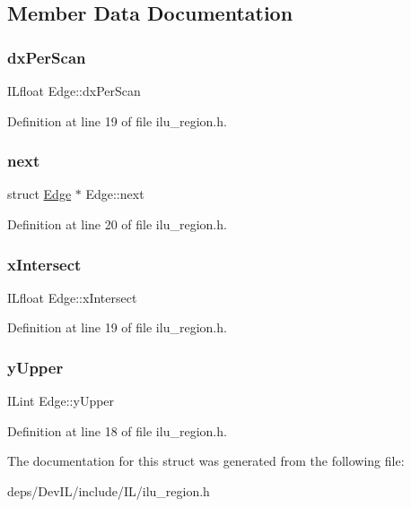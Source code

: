 \subsection{Member Data Documentation}
\mbox{\label{structEdge_ac68297f57351e80c50311788dfc7ebb7}} 
\subsubsection{\texorpdfstring{dx\+Per\+Scan}{dxPerScan}}
{\footnotesize\ttfamily I\+Lfloat Edge\+::dx\+Per\+Scan}



Definition at line 19 of file ilu\+\_\+region.\+h.

\mbox{\label{structEdge_a3cf3d57ae65110456b5d809a658757fc}} 
\subsubsection{\texorpdfstring{next}{next}}
{\footnotesize\ttfamily struct \hyperlink{structEdge}{Edge} $\ast$ Edge\+::next}



Definition at line 20 of file ilu\+\_\+region.\+h.

\mbox{\label{structEdge_a582f1338a0dceb913bdafa9be91da96f}} 
\subsubsection{\texorpdfstring{x\+Intersect}{xIntersect}}
{\footnotesize\ttfamily I\+Lfloat Edge\+::x\+Intersect}



Definition at line 19 of file ilu\+\_\+region.\+h.

\mbox{\label{structEdge_a1a16dc4d2ff0f05a9e6eabc7312be54b}} 
\subsubsection{\texorpdfstring{y\+Upper}{yUpper}}
{\footnotesize\ttfamily I\+Lint Edge\+::y\+Upper}



Definition at line 18 of file ilu\+\_\+region.\+h.



The documentation for this struct was generated from the following file\+:\begin{DoxyCompactItemize}
\item 
deps/\+Dev\+I\+L/include/\+I\+L/ilu\+\_\+region.\+h\end{DoxyCompactItemize}
